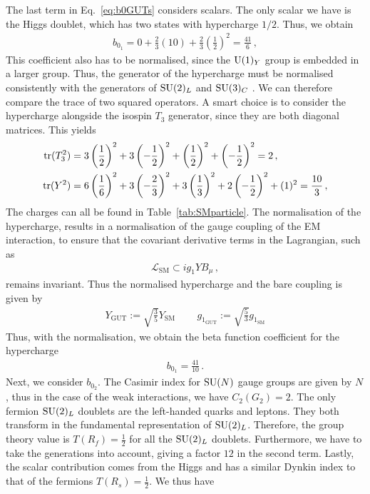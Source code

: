 The last term in Eq.~\eqref{eq:b0GUTs} considers scalars. The only scalar we have is the Higgs doublet, which has two states with hypercharge $1/2$. Thus, we obtain
\begin{align}
    b_{0_1}=0+\frac{2}{3}(10)+\frac{2}{3}\left(\frac{1}{2}\right)^2=\frac{41}{6}\,,
\end{align}
This coefficient also has to be normalised, since the $\mathrm{U}(1)_Y$ group is embedded in a larger group. Thus, the generator of the hypercharge must be normalised consistently with the generators of $\mathrm{SU}(2)_L$ and $\mathrm{SU}(3)_C$ \cite{Pernow:2021fvb}. We can therefore compare the trace of two squared operators. A smart choice is to consider the hypercharge alongside the isospin $T_3$ generator, since they are both diagonal matrices. This yields
\begin{align}
    \operatorname{tr}(T_3^2)&=3\left(\frac{1}{2}\right)^2+3\left(-\frac{1}{2}\right)^2+\left(\frac{1}{2}\right)^2+\left(-\frac{1}{2}\right)^2=2\,,\\
    \operatorname{tr}(Y^2)&=6\left(\frac{1}{6}\right)^2+3\left(-\frac{2}{3}\right)^2+3\left(\frac{1}{3}\right)^2+2\left(-\frac{1}{2}\right)^2+(1)^2=\frac{10}{3}\,,
\end{align}
The charges can all be found in Table~\ref{tab:SMparticle}. The normalisation of the hypercharge, results in a normalisation of the gauge coupling of the EM interaction, to ensure that the covariant derivative terms in the Lagrangian, such as
\begin{align}
    \mathcal{L}_{\text{SM}}\subset ig_1YB_\mu\,,
\end{align}
remains invariant. Thus the normalised hypercharge and the bare coupling is given by
\begin{align}
    Y_{\text{GUT}}:=\sqrt{\frac{3}{5}}Y_{\text{SM}}\,\qquad g_{1_{\text{GUT}}}:=\sqrt{\frac{5}{3}}g_{1_\text{SM}}
\end{align}
Thus, with the normalisation, we obtain the beta function coefficient for the hypercharge
\begin{align}
    b_{0_1}=\frac{41}{10}\,. \label{eq:b01}
\end{align}
Next, we consider $b_{0_2}$. The Casimir index for $\mathrm{SU}(N)$ gauge groups are given by $N$, thus in the case of the weak interactions, we have $C_2(G_2)=2$. The only fermion $\mathrm{SU}(2)_L$ doublets are the left-handed quarks and leptons. They both transform in the fundamental representation of $\mathrm{SU}(2)_L$. Therefore, the group theory value is $T(R_f)=\frac{1}{2}$ for all the $\mathrm{SU}(2)_L$ doublets. Furthermore, we have to take the generations into account, giving a factor $12$ in the second term. Lastly, the scalar contribution comes from the Higgs and has a similar Dynkin index to that of the fermions $T(R_s)=\frac{1}{2}$. We thus have
